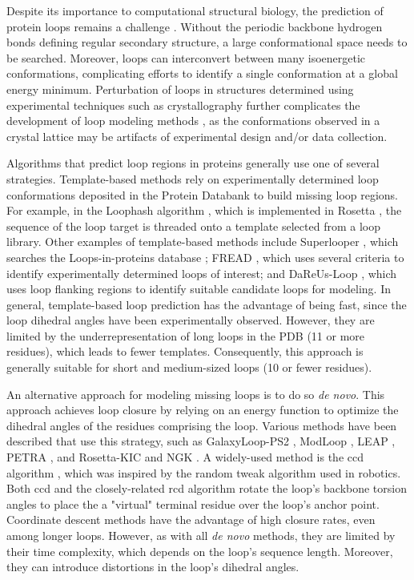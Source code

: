 Despite its importance to computational structural biology, the prediction of protein loops remains a challenge \citep*{Li2013}. Without the periodic backbone hydrogen bonds defining regular secondary structure, a large conformational space needs to be searched. Moreover, loops can interconvert between many isoenergetic conformations, complicating efforts to identify a single conformation at a global energy minimum. Perturbation of loops in structures determined using experimental techniques such as crystallography further complicates the development of loop modeling methods \citep*{Jacobson2004}, as the conformations observed in a crystal lattice may be artifacts of experimental design and/or data collection.

Algorithms that predict loop regions in proteins generally use one of several strategies. Template-based methods rely on experimentally determined loop conformations deposited in the Protein Databank to build missing loop regions. For example, in the Loophash algorithm \citep*{Tyka2012}, which is implemented in Rosetta \citep*{Leaver-fay2011, Leman2020}, the sequence of the loop target is threaded onto a template selected from a loop library. Other examples of template-based methods include Superlooper \citep*{Hildebrand2009}, which searches the Loops-in-proteins database \citep*{Michalsky2003}; FREAD \citep*{Choi2010}, which uses several criteria to identify experimentally determined loops of interest; and DaReUs-Loop \citep*{Karami2018, Karami2019}, which uses loop flanking regions to identify suitable candidate loops for modeling. In general, template-based loop prediction has the advantage of being fast, since the loop dihedral angles have been experimentally observed. However, they are limited by the underrepresentation of long loops in the PDB (11 or more residues), which leads to fewer templates. Consequently, this approach is generally suitable for short and medium-sized loops (10 or fewer residues).

An alternative approach for modeling missing loops is to do so \emph{de novo}. This approach achieves loop closure by relying on an energy function to optimize the dihedral angles of the residues comprising the loop. Various methods have been described that use this strategy, such as GalaxyLoop-PS2 \citep*{Park2014}, ModLoop \citep*{Fiser2000}, LEAP \citep*{Liang2014}, PETRA \citep*{Deane2000}, and Rosetta-KIC \citep*{Mandell2009} and NGK \citep*{Stein2013}. A widely-used method is the \gls{ccd} algorithm \citep*{Canutescu2003, Boomsma2005}, which was inspired by the random tweak algorithm used in robotics. Both \gls{ccd} and the closely-related \gls{rcd} algorithm \citep*{Chys2013} rotate the loop’s backbone torsion angles to place the a "virtual" terminal residue over the loop’s anchor point. Coordinate descent methods have the advantage of high closure rates, even among longer loops. However, as with all \emph{de novo} methods, they are limited by their time complexity, which depends on the loop's sequence length. Moreover, they can introduce distortions in the loop’s dihedral angles.

